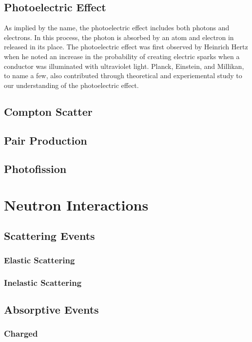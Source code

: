 \subsection{Photoelectric Effect}
As implied by the name, the photoelectric effect includes both photons and electrons.  In this process, the photon is absorbed by an atom and electron in released in its place.  The photoelectric effect was first observed by Heinrich Hertz when he noted an increase in the probability of creating electric sparks when a conductor was illuminated with ultraviolet light. \cite{hertz1887} Planck, Einstein, and Millikan, to name a few, also contributed through theoretical and experiemental study to our understanding of the photoelectric effect. \cite{einstein1905,millikan1914,millikan1916}



\subsection{Compton Scatter}
\subsection{Pair Production}
\subsection{Photofission}

\section{Neutron Interactions}
\subsection{Scattering Events}
\subsubsection{Elastic Scattering}
\subsubsection{Inelastic Scattering}
\subsection{Absorptive Events}
\subsubsection{Charged}
